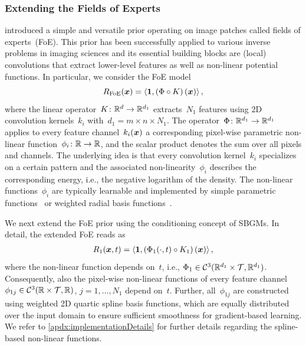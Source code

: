 \documentclass{article}
\newcommand{\C}{\mathcal{C}}
\newcommand{\T}{\mathcal{T}}
\newcommand{\scal}[2]{\left\langle#1,#2\right\rangle}
\renewcommand{\vec}[1]{\mathbf{#1}}
\theoremstyle{plain}
\theoremstyle{definition}
\theoremstyle{remark}
\begin{document}
\subsubsection{Extending the Fields of Experts}
\citet{RoBl09} introduced a simple and versatile prior operating on image patches called fields of experts~(FoE).
This prior has been successfully applied to various inverse problems in imaging sciences and its essential building blocks are (local) convolutions that extract lower-level features as well as non-linear potential functions.
In particular, we consider the FoE model
\[
R_\mathrm{FoE}(\vx) = \scal{\vec{1}}{\left(\Phi \circ K\right)(\vx)},
\]
where the linear operator~$K\colon\mathbb{R}^d\to\mathbb{R}^{d_1}$ extracts~$N_1$ features using 2D convolution kernels~$k_i$ with~$d_1=m\times n\times N_1$.
The operator~$\Phi\colon\mathbb{R}^{d_1}\to\mathbb{R}^{d_1}$ applies to every feature channel~$k_i({\bm{x}})$ a corresponding pixel-wise parametric non-linear function~$\phi_i\colon\mathbb{R}\to\mathbb{R}$, and the scalar product denotes the sum over all pixels and channels.
The underlying idea is that every convolution kernel~$k_i$ specializes on a certain pattern and the associated non-linearity~$\phi_i$ describes the corresponding energy, i.e., the negative logarithm of the density.
The non-linear functions~$\phi_i$ are typically learnable and implemented by simple parametric functions~\citep{RoBl09,ChRa14} or weighted radial basis functions~\citep{ChPo16,KoKl17}.

We next extend the FoE prior using the conditioning concept of SBGMs.
In detail, the extended FoE reads as
\begin{align}\label{eq:r1}
R_1(\vx,t) = \scal{\vec{1}}{\left(\Phi_1(\cdot, t) \circ K_1\right)(\vx)},
\end{align}
where the non-linear function depends on~$t$, i.e., $\Phi_1\in\C^3(\R^{d_1}\times\T,\R^{d_1})$.
Consequently, also the pixel-wise non-linear functions of every feature channel~$\phi_{1j}\in\C^3(\R\times\T,\R)$, $j=1,\ldots,N_1$ depend on~$t$. 
Further, all~$\phi_{1j}$ are constructed using weighted 2D quartic spline basis functions, which are equally distributed over the input domain to ensure sufficient smoothness for gradient-based learning.
We refer to \cref{apdx:implementationDetails} for further details regarding the spline-based non-linear functions.
\end{document}
